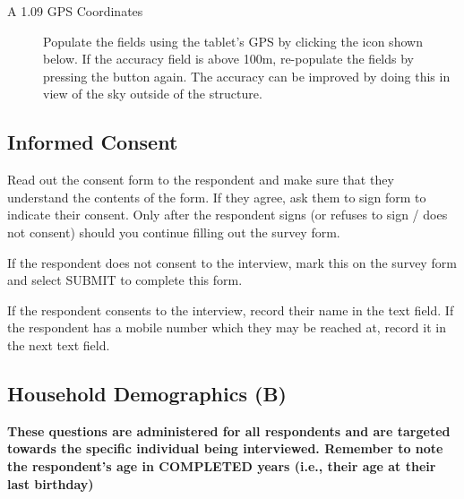 \documentclass[a4paper]{refart}
\begin{document}
\begin{description}


\item[A 1.09 GPS Coordinates] Populate the fields using the tablet's GPS by clicking the icon shown below. If the accuracy field is above 100m, re-populate the fields by pressing the button again. The accuracy can be improved by doing this in view of the sky outside of the structure.


\end{description}

\subsection{Informed Consent}
Read out the consent form to the respondent and make sure that they understand the contents of the form. If they agree, ask them to sign form to indicate their consent. Only after the respondent signs (or refuses to sign / does not consent) should you continue filling out the survey form.

If the respondent does not consent to the interview, mark this on the survey form and select SUBMIT to complete this form.


If the respondent consents to the interview, record their name in the text field. If the respondent has a mobile number which they may be reached at, record it in the next text field.


\subsection{Household Demographics (B)}
\textbf{These questions are administered for all respondents and are targeted towards the specific individual being interviewed. Remember to note the respondent's age in COMPLETED years (i.e., their age at their last birthday)}
\end{document}
